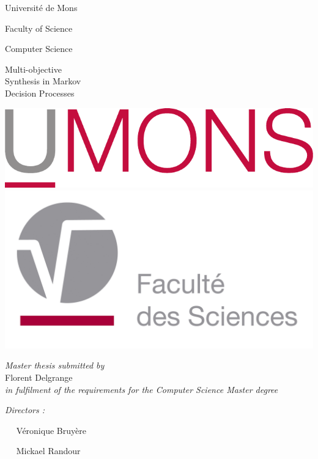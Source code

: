 \documentclass[12pt, twoside, openright]{report}
\theoremstyle{mystyle}
\theoremstyle{definition}%
\theoremstyle{remark}
\newcommand{\umonslogo}{\includegraphics[width=0.25\linewidth]{UMONS.pdf} \hfill                     \includegraphics[width=0.25\linewidth]{UMONS_FS.jpg}
                       }
\newcommand{\HRule}{\rule{\linewidth}{0.3mm}\\} %
\begin{document}
\thispagestyle{title}
{\selectfont
\begin{mdframed}[style=l3style]
\huge Université de Mons
\end{mdframed}
}

\begin{adjustbox}{minipage=.6\textwidth,center}
  Faculty of Science\par
  Computer Science
\end{adjustbox}

\vspace{5em}
\vspace{1em}

{\selectfont
\vspace{0.3em}
\begin{mdframed}[style=l3style]
Multi-objective \\Synthesis in Markov \\ Decision Processes
\end{mdframed}
}
\umonslogo

\vspace{4em}


\vspace{.3\linewidth}
\begin{adjustbox}{minipage=.6\textwidth,right}
\large
\begin{flushright}
\textit{Master thesis submitted by}\\Florent Delgrange\\ \textit{in fulfilment of the requirements for the Computer Science Master degree}\par
\end{flushright}
\textit{Directors : } \par $\quad$ Véronique Bruyère\par
$\quad$ Mickael Randour
\end{adjustbox}
\clearpage %
\end{document}
